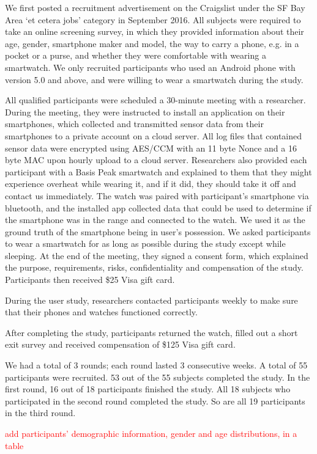 \documentclass{soups}
\begin{document}
We first posted a recruitment advertisement on the Craigslist under the SF Bay Area `et cetera jobs' category in September 2016. All subjects were required to take an online screening survey, in which they provided information about their age, gender, smartphone maker and model, the way to carry a phone, e.g. in a pocket or a purse, and whether they were comfortable with wearing a smartwatch. We only recruited participants who used an Android phone with version 5.0 and above, and were willing to wear a smartwatch during the study.

All qualified participants were scheduled a 30-minute meeting with a researcher. During the meeting, they were instructed to install an application on their smartphones, which collected and transmitted sensor data from their smartphones to a private account on a cloud server. All log files that contained sensor data were encrypted using AES/CCM with an 11 byte Nonce and a 16 byte MAC upon hourly upload to a cloud server. Researchers also provided each participant with a Basis Peak smartwatch and explained to them that they might experience overheat while wearing it, and if it did, they should take it off and contact us immediately. The watch was paired with participant's smartphone via bluetooth, and the installed app collected data that could be used to determine if the smartphone was in the range and connected to the watch. We used it as the ground truth of the smartphone being in user's possession. We asked participants to wear a smartwatch for as long as possible during the study except while sleeping. At the end of the meeting, they signed a consent form, which explained the purpose, requirements, risks, confidentiality and compensation of the study. Participants then received \$25 Visa gift card.

During the user study, researchers contacted participants weekly to make sure that their phones and watches functioned correctly.

After completing the study, participants returned the watch, filled out a short exit survey and received compensation of \$125 Visa gift card.

We had a total of 3 rounds; each round lasted 3 consecutive weeks. A total of 55 participants were recruited. 53 out of the 55 subjects completed the study. In the first round, 16 out of 18 participants finished the study. All 18 subjects who participated in the second round completed the study. So are all 19 participants in the third round.

\textcolor{red}{add participants' demographic information, gender and age distributions, in a table}
\end{document}

